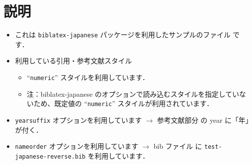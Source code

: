 \documentclass[10pt]{jlreq}
\begin{document}
\section{説明}

\begin{itemize}
 \item これは \texttt{biblatex-japanese} パッケージを利用したサンプルのファイル
       です．
 \item 利用している引用・参考文献スタイル
       \begin{itemize}
        \item ``\texttt{numeric}'' スタイルを利用しています．
        \item 注：biblatex-japanese のオプションで読み込むスタイルを指定していな
              いため、既定値の ``\texttt{numeric}'' スタイルが利用されています．
       \end{itemize}
 \item \texttt{yearsuffix} オプションを利用しています $\rightarrow$ 参考文献部分
       の year に「年」が付く．
 \item \texttt{nameorder} オプションを利用しています $\rightarrow$ bib ファイル
       に \texttt{test-japanese-reverse.bib} を利用しています．
\end{itemize}


\end{document}
